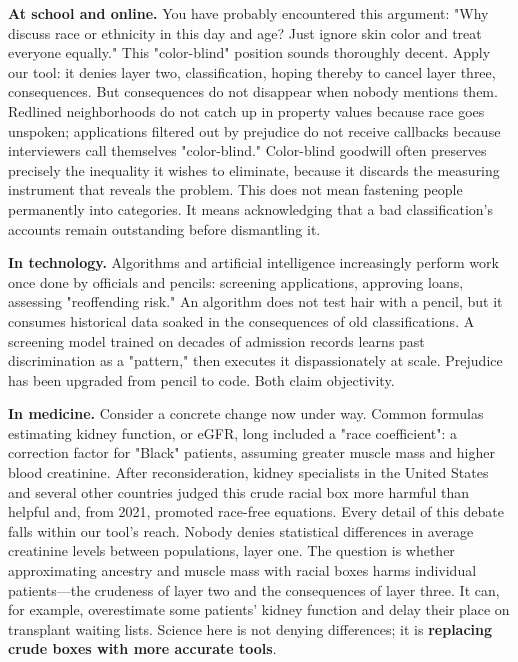 \textbf{At school and online.} You have probably encountered this argument: "Why discuss race or ethnicity in this day and age? Just ignore skin color and treat everyone equally." This "color-blind" position sounds thoroughly decent. Apply our tool: it denies layer two, classification, hoping thereby to cancel layer three, consequences. But consequences do not disappear when nobody mentions them. Redlined neighborhoods do not catch up in property values because race goes unspoken; applications filtered out by prejudice do not receive callbacks because interviewers call themselves "color-blind." Color-blind goodwill often preserves precisely the inequality it wishes to eliminate, because it discards the measuring instrument that reveals the problem. This does not mean fastening people permanently into categories. It means acknowledging that a bad classification's accounts remain outstanding before dismantling it.

\textbf{In technology.} Algorithms and artificial intelligence increasingly perform work once done by officials and pencils: screening applications, approving loans, assessing "reoffending risk." An algorithm does not test hair with a pencil, but it consumes historical data soaked in the consequences of old classifications. A screening model trained on decades of admission records learns past discrimination as a "pattern," then executes it dispassionately at scale. Prejudice has been upgraded from pencil to code. Both claim objectivity.

\textbf{In medicine.} Consider a concrete change now under way. Common formulas estimating kidney function, or eGFR, long included a "race coefficient": a correction factor for "Black" patients, assuming greater muscle mass and higher blood creatinine. After reconsideration, kidney specialists in the United States and several other countries judged this crude racial box more harmful than helpful and, from 2021, promoted race-free equations. Every detail of this debate falls within our tool's reach. Nobody denies statistical differences in average creatinine levels between populations, layer one. The question is whether approximating ancestry and muscle mass with racial boxes harms individual patients---the crudeness of layer two and the consequences of layer three. It can, for example, overestimate some patients' kidney function and delay their place on transplant waiting lists. Science here is not denying differences; it is \textbf{replacing crude boxes with more accurate tools}.


